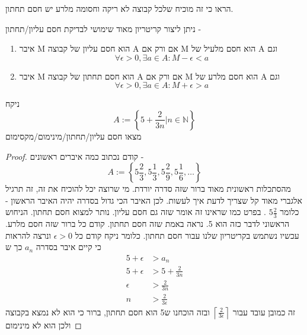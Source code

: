 \documentclass{article}
\begin{document}
\begin{homeexercise}
הראו כי זה מוכיח שלכל קבוצה לא ריקה וחסומה מלרע יש חסם תחתון.
\end{homeexercise}

ניתן ליצור קריטריון מאוד שימושי לבדיקת חסם עליון/תחתון - 

\begin{theorem}


\begin{enumerate}
\item
איבר M הוא חסם עליון של קבוצה A אם ורק אם M הוא חסם מלעיל של A וגם
\[\forall\epsilon>0,\exists a\in A: M-\epsilon<a\]

\item 
איבר M הוא חסם תחתון של קבוצה A אם ורק אם M הוא חסם מלרע של A וגם
\[\forall\epsilon>0,\exists a\in A: M+\epsilon>a\]

\end{enumerate}
\end{theorem}

\begin{exercise}
ניקח 
\[A:=\left\{5+\frac{2}{3n}\Big| n\in\mathbb{N}\right\}\]
מצאו חסם עליון/תחתון/מינימום/מקסימום

\end{exercise}
\begin{proof}
קודם נכתוב כמה איברים ראשונים - 
\[A:=\left\{5\frac{2}{3}, 5\frac{1}{3}, 5\frac{2}{9}, 5\frac{1}{6}, \dots\right\}\]
מהסתכלות ראשונית מאוד ברור שזה סדרה יורדת. מי שרוצה יכל להוכיח את זה, זה תרגיל אלגברי מאוד קל שצריך לדעת איך לעשות. לכן האיבר הכי גדול בסדרה יהיה האיבר הראשון - כלומר 
$5\frac{2}{3}$
.
בפרט כמו שראינו זה אומר שזה גם חסם עליון. נותר למצוא חסם תחתון. הניחוש הראשוני לדבר כזה הוא 5. נראה באמת שזה חסם תחתון. קודם כל ברור שזה חסם מלרע. עכשיו נשתמש בקריטריון שלנו עבור חסם תחתון. כלומר ניקח קודם כל 
$\epsilon>0$
ונרצה להראות כי קיים איבר בסדרה 
$a_n$
כך ש
\begin{align*}
5+\epsilon &> a_n \\
5+\epsilon &> 5+\frac{2}{3n} \\
\epsilon &> \frac{2}{3n} \\
n &> \frac{2}{3\epsilon}
\end{align*}
זה כמובן עובד עבור 
$\left\lceil \frac{2}{3\epsilon}\right\rceil$
ובזה הוכחנו ש5 הוא חסם תחתון, ברור כי הוא לא נמצא בקבוצה ולכן הוא לא מינימום
\end{proof}
\end{document}
